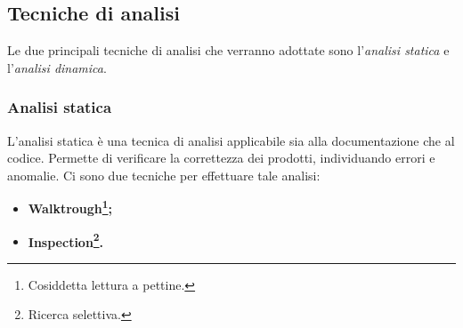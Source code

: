 \subsection{Tecniche di analisi}
Le due principali tecniche di analisi che verranno adottate sono l'\textit{analisi statica} e l'\textit{analisi dinamica}.
	\subsubsection{Analisi statica}
	L'analisi statica è una tecnica di analisi applicabile sia alla documentazione che al codice. Permette di verificare la correttezza dei prodotti, individuando errori e anomalie. Ci sono due tecniche per effettuare tale analisi:
	\begin{itemize}
		\item \textbf{Walktrough\footnote{Cosiddetta lettura a pettine.};}
		\item \textbf{Inspection\footnote{Ricerca selettiva.}.}
	\end{itemize}
	
